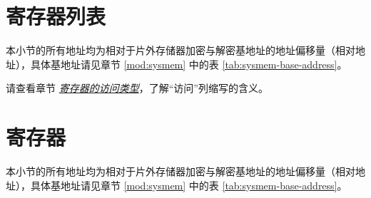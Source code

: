 \documentclass[main\_\_CN.tex]{subfiles}
\begin{document}



\clearpage
\section{寄存器列表}
\label{sec:extmemencr-reg-summ}
\hypertarget{extmemencr-reg-summ}{}

本小节的所有地址均为相对于片外存储器加密与解密基地址的地址偏移量（相对地址），具体基地址请见章节 \ref{mod:sysmem} \textit{} 中的表 \ref{tab:sysmem-base-address}。

请查看章节 \hyperref[glossary-access-types]{\textit{寄存器的访问类型}}，了解“访问”列缩写的含义。






\clearpage
\section{寄存器}

本小节的所有地址均为相对于片外存储器加密与解密基地址的地址偏移量（相对地址），具体基地址请见章节 \ref{mod:sysmem} \textit{} 中的表 \ref{tab:sysmem-base-address}。


\end{document}

